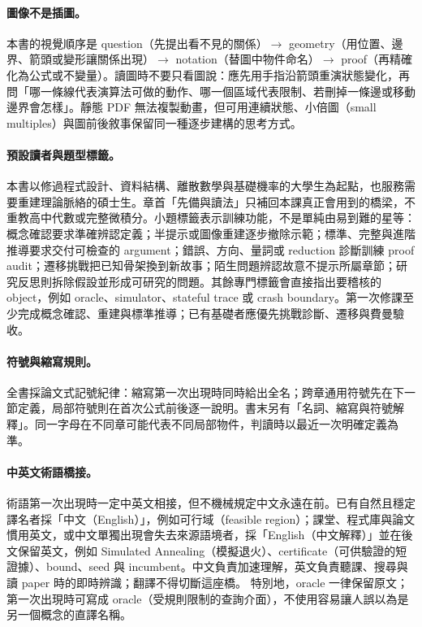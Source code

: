 \documentclass[11pt,a4paper,oneside,openany]{book}
\begin{document}
\paragraph{圖像不是插圖。}
本書的視覺順序是 question（先提出看不見的關係）$\to$ geometry（用位置、邊界、箭頭或變形讓關係出現）$\to$ notation（替圖中物件命名）$\to$ proof（再精確化為公式或不變量）。讀圖時不要只看圖說：應先用手指沿箭頭重演狀態變化，再問「哪一條線代表演算法可做的動作、哪一個區域代表限制、若刪掉一條邊或移動邊界會怎樣」。靜態 PDF 無法複製動畫，但可用連續狀態、小倍圖（small multiples）與圖前後敘事保留同一種逐步建構的思考方式。

\paragraph{預設讀者與題型標籤。}
本書以修過程式設計、資料結構、離散數學與基礎機率的大學生為起點，也服務需要重建理論脈絡的碩士生。章首「先備與讀法」只補回本課真正會用到的橋梁，不重教高中代數或完整微積分。小題標籤表示訓練功能，不是單純由易到難的星等：概念確認要求準確辨認定義；半提示或圖像重建逐步撤除示範；標準、完整與進階推導要求交付可檢查的 argument；錯誤、方向、量詞或 reduction 診斷訓練 proof audit；遷移挑戰把已知骨架換到新故事；陌生問題辨認故意不提示所屬章節；研究反思則拆除假設並形成可研究的問題。其餘專門標籤會直接指出要稽核的 object，例如 oracle、simulator、stateful trace 或 crash boundary。第一次修課至少完成概念確認、重建與標準推導；已有基礎者應優先挑戰診斷、遷移與費曼驗收。

\paragraph{符號與縮寫規則。}
全書採論文式記號紀律：縮寫第一次出現時同時給出全名；跨章通用符號先在下一節定義，局部符號則在首次公式前後逐一說明。書末另有「名詞、縮寫與符號解釋」。同一字母在不同章可能代表不同局部物件，判讀時以最近一次明確定義為準。

\paragraph{中英文術語橋接。}
術語第一次出現時一定中英文相接，但不機械規定中文永遠在前。已有自然且穩定譯名者採「中文（English）」，例如可行域（feasible region）；課堂、程式庫與論文慣用英文，或中文單獨出現會失去來源語境者，採「English（中文解釋）」並在後文保留英文，例如 Simulated Annealing（模擬退火）、certificate（可供驗證的短證據）、bound、seed 與 incumbent。中文負責加速理解，英文負責聽課、搜尋與讀 paper 時的即時辨識；翻譯不得切斷這座橋。
特別地，oracle 一律保留原文；第一次出現時可寫成 oracle（受規則限制的查詢介面），不使用容易讓人誤以為是另一個概念的直譯名稱。
\end{document}
